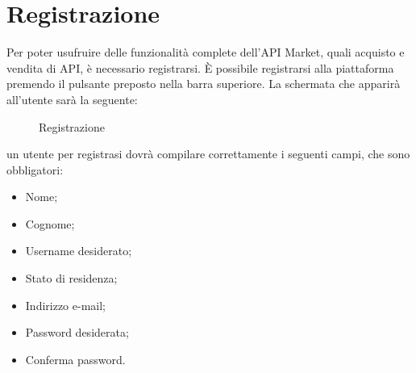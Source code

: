 \newpage
\section{Registrazione}
Per poter usufruire delle funzionalità complete dell'API Market, quali acquisto e vendita di API, è necessario registrarsi. \MakeUppercase{è} possibile registrarsi alla piattaforma premendo il pulsante preposto nella barra superiore. La schermata che apparirà all'utente sarà la seguente:

\label{Registrazione}
\begin{figure}[H]
	\centering
	\caption{Registrazione}
\end{figure}

un utente per registrasi dovrà compilare correttamente i seguenti campi, che sono obbligatori:
\begin{itemize}
	\item Nome;
	\item Cognome;
	\item Username desiderato;
	\item Stato di residenza;
	\item Indirizzo e-mail;
	\item Password desiderata;
	\item Conferma password.
\end{itemize}

